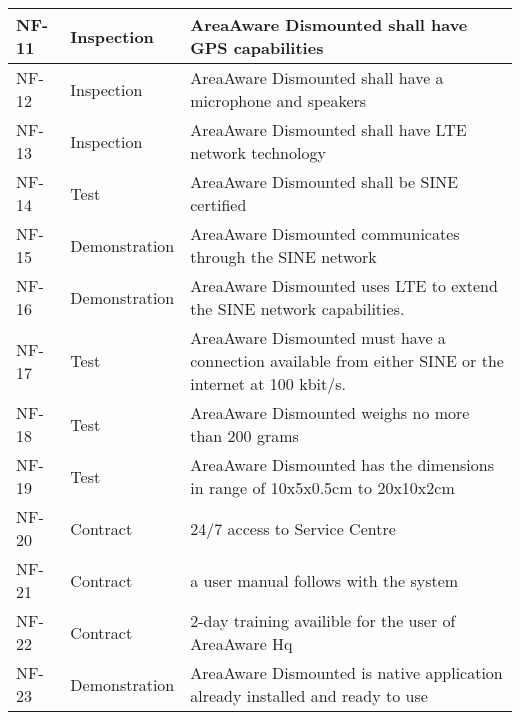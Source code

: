 \begin{longtable}{| p{2.4cm}  | p{2.6cm} | p{6.6cm} |  }
	NF-11	& Inspection	& AreaAware Dismounted shall have GPS capabilities \\ \hline
	NF-12	& Inspection	& AreaAware Dismounted shall have a microphone and speakers \\ \hline
	NF-13	& Inspection	& AreaAware Dismounted shall have LTE network technology \\ \hline
	NF-14	& Test			& AreaAware Dismounted shall be SINE certified \\ \hline
	NF-15	& Demonstration	& AreaAware Dismounted communicates through the SINE network \\ \hline
	NF-16	& Demonstration	& AreaAware Dismounted uses LTE to extend the SINE network capabilities. \\ \hline
	NF-17	& Test			& AreaAware Dismounted must have a connection available from either SINE or the internet at 100 kbit/s. \\ \hline
	NF-18	& Test			& AreaAware Dismounted  weighs no more than 200 grams\\ \hline
	NF-19	& Test			& AreaAware Dismounted  has the dimensions in range of 10x5x0.5cm to 20x10x2cm\\ \hline
	NF-20	& Contract		& 24/7 access to Service Centre\\ \hline
	NF-21	& Contract		& a user manual follows with the system\\ \hline
	NF-22	& Contract		& 2-day training availible for the user of AreaAware Hq \\ \hline
	NF-23	& Demonstration	& AreaAware Dismounted is native application already installed and ready to use \\ \hline
\end{longtable}